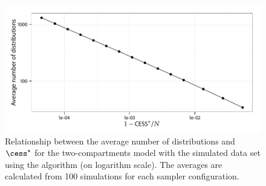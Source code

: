 \begin{figure}[t]
  \UseAltLinespread
  \includegraphics[width=\linewidth]{fig_src/CESS_Iter_Mean}
  \caption[Relationship between the average number of distributions and
  \protect\cess]
  {Relationship between the average number of distributions and $\cess^\star$ for the two-compartments \pet model with the simulated data set using the \smc[2] algorithm (on logarithm scale). The averages are calculated from 100 simulations for each sampler configuration.}
  \label{fig:cess iter mean}
\end{figure}

